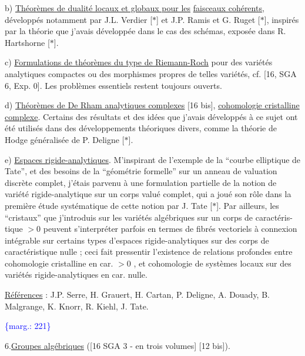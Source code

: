 \documentclass[11pt]{article}
\newcommand{\scanpage}[1]{\par\bigskip\noindent{\small\sffamily[scan #1]}\par}
\newcommand{\mspage}[1]{{\small\sffamily[p.\,#1]}}
\newcommand{\margin}[1]{\textcolor{blue}{\{\textsf{marg.:} #1\}}}
\newcommand{\uline}[1]{\underline{#1}}
\begin{document}
b) \uline{Théorèmes de dualité locaux et globaux pour les}
\uline{faisceaux cohérents}, développés notamment par
J.L. Verdier [$*$] et J.P. Ramis et G. Ruget [$*$], inspirés
par la théorie que j'avais développée dans le cas des
schémas, exposée dans R. Hartshorne [$*$].

c) \uline{Formulations de théorèmes du type de Riemann-Roch}
pour des variétés analytiques compactes ou des morphismes
propres de telles variétés, cf. [16, SGA 6, Exp. 0].
Les problèmes essentiels restent toujours ouverts.

d) \uline{Théorèmes de De Rham analytiques complexes} [16 bis],
\uline{cohomologie cristalline complexe}. Certains des résultats
et des idées que j'avais développés à ce sujet ont été
utilisés dans des développements théoriques divers, comme
la théorie de Hodge généralisée de P. Deligne [$*$].

e) \uline{Espaces rigide-analytiques}. M'inspirant de l'exemple
de la ``courbe elliptique de Tate'', et des besoins de
la ``géométrie formelle'' sur un anneau de valuation
discrète complet, j'étais parvenu à une formulation
partielle de la notion de variété rigide-analytique
sur un corps valué complet, qui a joué son rôle dans
la première étude systématique de cette notion par
J. Tate [$*$]. Par ailleurs, les ``cristaux'' que j'introduis
sur les variétés algébriques sur un corps de caractéris-%
tique $> 0$ peuvent s'interpréter parfois en termes de
fibrés vectoriels à connexion intégrable sur certains
types d'espaces rigide-analytiques sur des corps de
caractéristique nulle ; ceci fait pressentir l'existence
de relations profondes entre cohomologie cristalline
en car. $> 0$ , et cohomologie de systèmes locaux sur
des variétés rigide-analytiques en car. nulle.

\uline{Références} : J.P. Serre, H. Grauert, H. Cartan, P. Deligne,
A. Douady, B. Malgrange, K. Knorr, R. Kiehl,
J. Tate.

\margin{221}

\clearpage
\scanpage{119/222}
\mspage{. 9 .}

6.\quad \uline{Groupes algébriques} ([16 SGA 3 - en trois volumes]
[12 bis]).
\end{document}

